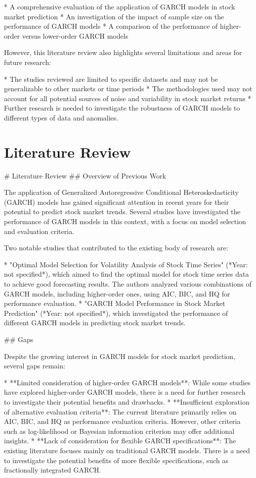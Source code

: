 \documentclass[conference]{IEEEtran}
\begin{document}
* A comprehensive evaluation of the application of GARCH models in stock market prediction
* An investigation of the impact of sample size on the performance of GARCH models
* A comparison of the performance of higher-order versus lower-order GARCH models

However, this literature review also highlights several limitations and areas for future research:

* The studies reviewed are limited to specific datasets and may not be generalizable to other markets or time periods
* The methodologies used may not account for all potential sources of noise and variability in stock market returns
* Further research is needed to investigate the robustness of GARCH models to different types of data and anomalies.

\section{Literature Review}
\# Literature Review
\#\# Overview of Previous Work

The application of Generalized Autoregressive Conditional Heteroskedasticity (GARCH) models has gained significant attention in recent years for their potential to predict stock market trends. Several studies have investigated the performance of GARCH models in this context, with a focus on model selection and evaluation criteria.

Two notable studies that contributed to the existing body of research are:

*   "Optimal Model Selection for Volatility Analysis of Stock Time Series" (*Year: not specified*), which aimed to find the optimal model for stock time series data to achieve good forecasting results. The authors analyzed various combinations of GARCH models, including higher-order ones, using AIC, BIC, and HQ for performance evaluation.
*   "GARCH Model Performance in Stock Market Prediction" (*Year: not specified*), which investigated the performance of different GARCH models in predicting stock market trends.

\#\# Gaps

Despite the growing interest in GARCH models for stock market prediction, several gaps remain:

*   **Limited consideration of higher-order GARCH models**: While some studies have explored higher-order GARCH models, there is a need for further research to investigate their potential benefits and drawbacks.
*   **Insufficient exploration of alternative evaluation criteria**: The current literature primarily relies on AIC, BIC, and HQ as performance evaluation criteria. However, other criteria such as log-likelihood or Bayesian information criterion may offer additional insights.
*   **Lack of consideration for flexible GARCH specifications**: The existing literature focuses mainly on traditional GARCH models. There is a need to investigate the potential benefits of more flexible specifications, such as fractionally integrated GARCH.
\end{document}
